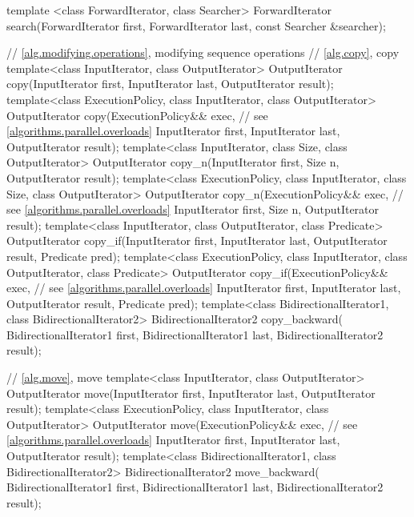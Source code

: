 \begin{codeblock}
{  template <class ForwardIterator, class Searcher>
    ForwardIterator search(ForwardIterator first, ForwardIterator last,
                           const Searcher &searcher);

  // \ref{alg.modifying.operations}, modifying sequence operations
  // \ref{alg.copy}, copy
  template<class InputIterator, class OutputIterator>
    OutputIterator copy(InputIterator first, InputIterator last,
                        OutputIterator result);
  template<class ExecutionPolicy, class InputIterator, class OutputIterator>
    OutputIterator copy(ExecutionPolicy&& exec, // see \ref{algorithms.parallel.overloads}
                        InputIterator first, InputIterator last,
                        OutputIterator result);
  template<class InputIterator, class Size, class OutputIterator>
    OutputIterator copy_n(InputIterator first, Size n,
                          OutputIterator result);
  template<class ExecutionPolicy, class InputIterator, class Size,
           class OutputIterator>
    OutputIterator copy_n(ExecutionPolicy&& exec, // see \ref{algorithms.parallel.overloads}
                          InputIterator first, Size n,
                          OutputIterator result);
  template<class InputIterator, class OutputIterator, class Predicate>
    OutputIterator copy_if(InputIterator first, InputIterator last,
                           OutputIterator result, Predicate pred);
  template<class ExecutionPolicy, class InputIterator, class OutputIterator,
           class Predicate>
    OutputIterator copy_if(ExecutionPolicy&& exec, // see \ref{algorithms.parallel.overloads}
                           InputIterator first, InputIterator last,
                           OutputIterator result, Predicate pred);
  template<class BidirectionalIterator1, class BidirectionalIterator2>
    BidirectionalIterator2 copy_backward(
      BidirectionalIterator1 first, BidirectionalIterator1 last,
      BidirectionalIterator2 result);

  // \ref{alg.move}, move
  template<class InputIterator, class OutputIterator>
    OutputIterator move(InputIterator first, InputIterator last,
                        OutputIterator result);
  template<class ExecutionPolicy, class InputIterator,
           class OutputIterator>
    OutputIterator move(ExecutionPolicy&& exec, // see \ref{algorithms.parallel.overloads}
                        InputIterator first, InputIterator last,
                        OutputIterator result);
  template<class BidirectionalIterator1, class BidirectionalIterator2>
    BidirectionalIterator2 move_backward(
      BidirectionalIterator1 first, BidirectionalIterator1 last,
      BidirectionalIterator2 result);

}
\end{codeblock}

